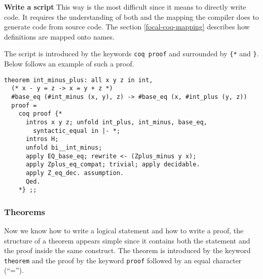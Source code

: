 \begin{compact-itemize}
  \item {\bf Write a {\coq} script} This way is the most difficult
     since it means to directly write {\coq} code. It
    requires the understanding of both {\coq} and the mapping the
    {\focal} compiler does to generate {\coq} code from {\focal} source
    code. The section \ref{focal-coq-mapping} describes %
     how {\focal} definitions are mapped onto
    {\coq} names.

The {\coq} script is introduced by the keywords {\tt coq proof} and
surrounded by {\tt \{*} and {\tt *\}}.
Below follows an example of such a proof.

{\scriptsize
\begin{lstlisting}
theorem int_minus_plus: all x y z in int,
  (* x - y = z -> x = y + z *)
  #base_eq (#int_minus (x, y), z) -> #base_eq (x, #int_plus (y, z))
  proof =
    coq proof {*
      intros x y z; unfold int_plus, int_minus, base_eq,
        syntactic_equal in |- *;
      intros H;
      unfold bi__int_minus;
      apply EQ_base_eq; rewrite <- (Zplus_minus y x);
      apply Zplus_eq_compat; trivial; apply decidable.
      apply Z_eq_dec. assumption.
      Qed.
    *} ;;
\end{lstlisting}}
\end{compact-itemize}



\subsubsection{Theorems}
Now we know how to write a logical statement and how
to write a proof, the structure of a theorem appears simple since it
contains both the statement and the proof inside the same
construct. The theorem is introduced by the keyword {\tt theorem} and
the proof by the keyword {\tt proof} followed by an equal character
(``='').
\begin{syn}
 \is
    \tok{:} 
   
\end{syn}


